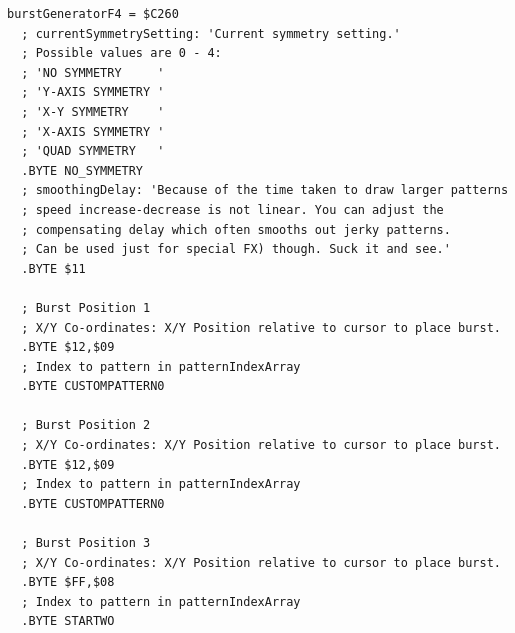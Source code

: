 \begin{lstlisting}[caption=Source code for the F4 Burst.]
burstGeneratorF4 = $C260
  ; currentSymmetrySetting: 'Current symmetry setting.'
  ; Possible values are 0 - 4:
  ; 'NO SYMMETRY     '
  ; 'Y-AXIS SYMMETRY '
  ; 'X-Y SYMMETRY    '
  ; 'X-AXIS SYMMETRY '
  ; 'QUAD SYMMETRY   '
  .BYTE NO_SYMMETRY
  ; smoothingDelay: 'Because of the time taken to draw larger patterns
  ; speed increase-decrease is not linear. You can adjust the 
  ; compensating delay which often smooths out jerky patterns. 
  ; Can be used just for special FX) though. Suck it and see.'
  .BYTE $11

  ; Burst Position 1
  ; X/Y Co-ordinates: X/Y Position relative to cursor to place burst.
  .BYTE $12,$09
  ; Index to pattern in patternIndexArray
  .BYTE CUSTOMPATTERN0

  ; Burst Position 2
  ; X/Y Co-ordinates: X/Y Position relative to cursor to place burst.
  .BYTE $12,$09
  ; Index to pattern in patternIndexArray
  .BYTE CUSTOMPATTERN0

  ; Burst Position 3
  ; X/Y Co-ordinates: X/Y Position relative to cursor to place burst.
  .BYTE $FF,$08
  ; Index to pattern in patternIndexArray
  .BYTE STARTWO

\end{lstlisting}

